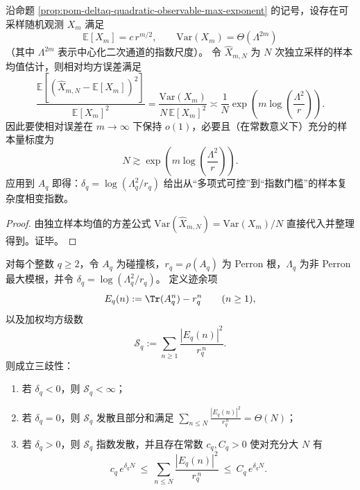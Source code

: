 \begin{corollary}[越线相的最小样本指数阈值]\label{cor:pom-deltaq-sample-complexity-threshold}
沿命题 \ref{prop:pom-deltaq-quadratic-observable-max-exponent} 的记号，设存在可采样随机观测 \(X_m\) 满足
\[
\mathbb E[X_m]=c\,r^{m/2},\qquad \mathrm{Var}(X_m)=\Theta(\Lambda^{2m})
\]
（其中 \(\Lambda^{2m}\) 表示中心化二次通道的指数尺度）。
令 \(\widehat X_{m,N}\) 为 \(N\) 次独立采样的样本均值估计，则相对均方误差满足
\[
\frac{\mathbb E[(\widehat X_{m,N}-\mathbb E[X_m])^2]}{\mathbb E[X_m]^2}
=\frac{\mathrm{Var}(X_m)}{N\,\mathbb E[X_m]^2}
\asymp
\frac{1}{N}\exp\!\left(m\log\!\left(\frac{\Lambda^2}{r}\right)\right).
\]
因此要使相对误差在 \(m\to\infty\) 下保持 \(o(1)\)，必要且（在常数意义下）充分的样本量标度为
\[
N\gtrsim \exp\!\left(m\log\!\left(\frac{\Lambda^2}{r}\right)\right).
\]
应用到 \(A_q\) 即得：\(\delta_q=\log(\Lambda_q^2/r_q)\) 给出从“多项式可控”到“指数门槛”的样本复杂度相变指数。
\end{corollary}
\begin{proof}
由独立样本均值的方差公式
\(
\mathrm{Var}(\widehat X_{m,N})=\mathrm{Var}(X_m)/N
\)
直接代入并整理得到。证毕。
\end{proof}

\begin{theorem}\label{thm:pom-deltaq-mean-square-rh-criterion}
对每个整数 \(q\ge 2\)，令 \(A_q\) 为碰撞核，\(r_q=\rho(A_q)\) 为 Perron 根，\(\Lambda_q\) 为非 Perron 最大模根，并令 \(\delta_q=\log(\Lambda_q^2/r_q)\)。
定义迹余项
\[
E_q(n):=\Tr(A_q^n)-r_q^n\qquad(n\ge 1),
\]
以及加权均方级数
\[
\mathcal S_q:=\sum_{n\ge 1}\frac{|E_q(n)|^2}{r_q^{\,n}}.
\]
则成立三歧性：
\begin{enumerate}
  \item 若 \(\delta_q<0\)，则 \(\mathcal S_q<\infty\)；
  \item 若 \(\delta_q=0\)，则 \(\mathcal S_q\) 发散且部分和满足 \(\sum_{n\le N}\frac{|E_q(n)|^2}{r_q^{\,n}}=\Theta(N)\)；
  \item 若 \(\delta_q>0\)，则 \(\mathcal S_q\) 指数发散，并且存在常数 \(c_q,C_q>0\) 使对充分大 \(N\) 有
  \[
  c_q\,e^{\delta_q N}
  \ \le\
  \sum_{n\le N}\frac{|E_q(n)|^2}{r_q^{\,n}}
  \ \le\
  C_q\,e^{\delta_q N}.
  \]
\end{enumerate}
\end{theorem}

